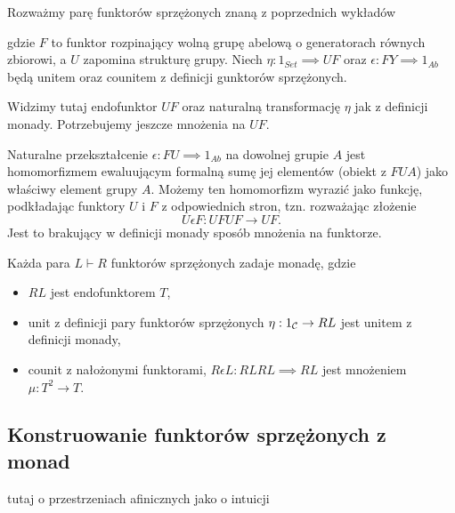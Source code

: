 \begin{example}
  Rozważmy parę funktorów sprzężonych znaną z poprzednich wykładów
  \begin{center}
  \end{center}
  gdzie $F$ to funktor rozpinający wolną grupę abelową o generatorach równych zbiorowi, a $U$ zapomina strukturę grupy. Niech $\eta:1_{Set}\implies UF$ oraz $\epsilon:FY\implies 1_{Ab}$ będą unitem oraz counitem z definicji gunktorów sprzężonych.

  Widzimy tutaj endofunktor $UF$ oraz naturalną transformację $\eta$ jak z definicji monady. Potrzebujemy jeszcze mnożenia na $UF$.

  Naturalne przekształcenie $\epsilon:FU\implies 1_{Ab}$ na dowolnej grupie $A$ jest homomorfizmem ewaluującym formalną sumę jej elementów (obiekt z $FUA$) jako właściwy element grupy $A$. Możemy ten homomorfizm wyrazić jako funkcję, podkładając funktory $U$ i $F$ z odpowiednich stron, tzn. rozważając złożenie
  $$U\epsilon F:UFUF\to UF.$$
  Jest to brakujący w definicji monady sposób mnożenia na funktorze.
\end{example}

\begin{lemma}{}{}
  Każda para $L\vdash R$ funktorów sprzężonych zadaje monadę, gdzie
  \begin{itemize}
    \item $RL$ jest endofunktorem $T$,
    \item unit z definicji pary funktorów sprzężonych $\eta:1_{\mathcal{C}}\to RL$ jest unitem z definicji monady,
    \item counit z nałożonymi funktorami, $R\epsilon L:RLRL\implies RL$ jest mnożeniem $\mu:T^2\to T$.
  \end{itemize}
\end{lemma}

\subsection{Konstruowanie funktorów sprzężonych z monad}

tutaj o przestrzeniach afinicznych jako o intuicji

